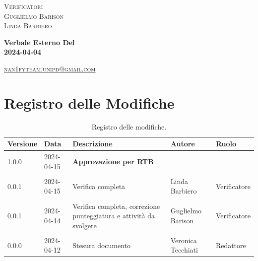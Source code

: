 \documentclass[8pt]{article}
\begin{document}
\begin{titlepage}
\begin{minipage}[t]{0.47\textwidth}
		{\large{\textsc{Verificatori}}
			\vspace{3mm}
			{\\\large{\textsc{Guglielmo Barison}\\}} %
			{\large{\textsc{Linda Barbiero}}}
			
		}
		\vspace{4mm}\vspace{4mm}
	\end{minipage}
	\vspace{4cm}
	\begin{center}
		\begin{flushright}
			{\fontsize{30pt}{52pt}\selectfont \textbf{Verbale Esterno Del\\2024-04-04\\}}
		\end{flushright}
		\vspace{3cm}
	\end{center}
	\vspace{8.5 cm}
	{\small \textsc{\href{mailto: nan1fyteam.unipd@gmail.com}{nan1fyteam.unipd@gmail.com}}}
\end{titlepage}
\pagestyle{mystyle}
\section*{Registro delle Modifiche}
\begin{table}[ht!]	
	\centering
	\begin{tabular}{p{1.2cm} p{2cm} p{6cm} p{3cm} p{2cm}}
		\toprule
		\textbf{Versione}& \textbf{Data} & \textbf{Descrizione} & \textbf{Autore} & \textbf{Ruolo} \\
		\midrule
		1.0.0 & 2024-04-15 & \textbf{Approvazione per RTB} & & \\\\
		0.0.1 & 2024-04-15 & Verifica completa & Linda Barbiero & Verificatore \\\\
		0.0.1 & 2024-04-14 & Verifica completa, correzione punteggiatura e attività da svolgere & Guglielmo Barison & Verificatore \\\\
		0.0.0 & 2024-04-12 & Stesura documento & Veronica Tecchiati & Redattore \\
		\bottomrule
	\end{tabular}
	\caption{Registro delle modifiche.}
	\label{table:Registro delle modifiche}
\end{table}
\newpage
\tableofcontents
\clearpage
\newpage
\justifying
\end{document}
